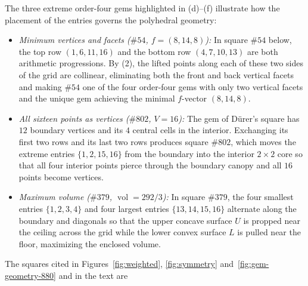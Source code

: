 The three extreme order-four gems highlighted in (d)--(f) illustrate how the placement of the entries governs the polyhedral geometry:
\begin{itemize}\setlength\itemsep{1pt}
\item \emph{Minimum vertices and facets ($\#54$, $f=(8,14,8)$):} In square $\#54$ below, the top row $(1,6,11,16)$ and the bottom row $(4,7,10,13)$ are both arithmetic progressions. By (2), the lifted points along each of these two sides of the grid are collinear, eliminating both the front and back vertical facets and making $\#54$ one of the four order-four gems with only two vertical facets and the unique gem achieving the minimal $f$-vector $(8,14,8)$.
\item \emph{All sixteen points as vertices ($\#802$, $V=16$):} The gem of D\"urer's square has $12$ boundary vertices and its $4$ central cells in the interior. Exchanging its first two rows and its last two rows produces square $\#802$, which moves the extreme entries $\{1,2,15,16\}$ from the boundary into the interior $2\times2$ core so that all four interior points pierce through the boundary canopy and all $16$ points become vertices.
\item \emph{Maximum volume ($\#379$, $\operatorname{vol}=292/3$):} In square $\#379$, the four smallest entries $\{1,2,3,4\}$ and four largest entries $\{13,14,15,16\}$ alternate along the boundary and diagonals so that the upper concave surface $U$ is propped near the ceiling across the grid while the lower convex surface $L$ is pulled near the floor, maximizing the enclosed volume.
\end{itemize}
The squares cited in Figures~\ref{fig:weighted}, \ref{fig:symmetry} and~\ref{fig:gem-geometry-880} and in the text are
